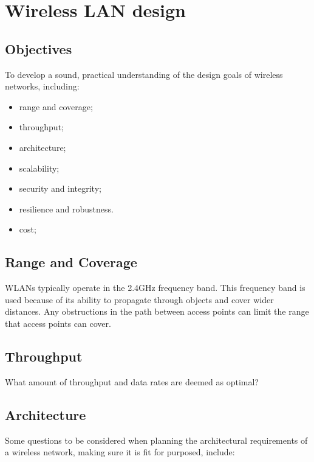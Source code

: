 \chapter{Wireless LAN design}\label{design}

\minitoc 

\clearpage
\section*{Objectives}
To develop a sound, practical understanding of the design goals of wireless networks, including:
\begin{itemize}

\item range and coverage;

\item throughput;

\item architecture;

\item scalability;

\item security and integrity;

\item resilience and robustness.

\item cost;

\end{itemize}


\section{Range and Coverage}
WLANs typically operate in the 2.4GHz frequency band. This frequency band is used because of its ability to propagate through objects and cover wider distances. Any obstructions in the path between access points can limit the range that access points can cover.


\section{Throughput}
What amount of throughput and data rates are deemed as optimal?


\section{Architecture}
Some questions to be considered when planning the architectural requirements of a wireless network, making sure it is fit for purposed, include:

